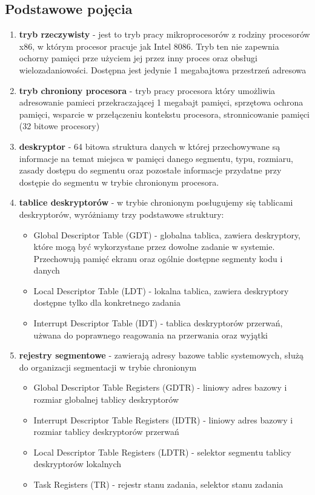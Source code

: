 \documentclass[a4paper,12pt]{article}
\begin{document}
	\subsection{Podstawowe pojęcia}
\begin{enumerate}
				\item{\textbf{tryb rzeczywisty} - jest to tryb pracy mikroprocesorów z rodziny procesorów x86, w którym procesor pracuje jak Intel 8086. Tryb ten nie zapewnia ochorny pamięci prze użyciem jej przez inny proces oraz obsługi wielozadaniowości. Dostępna jest jedynie 1 megabajtowa przestrzeń adresowa}

				\item{\textbf{tryb chroniony procesora} - tryb pracy procesora który umożliwia adresowanie pamieci przekraczającej 1 megabajt pamięci, sprzętowa ochrona pamięci, wsparcie w przełączeniu kontekstu procesora, stronnicowanie pamięci (32 bitowe procesory) }

				\item{\textbf{deskryptor} - 64 bitowa struktura danych w której przechowywane są informacje na temat miejsca w pamięci danego segmentu, typu, rozmiaru, zasady dostępu do segmentu oraz pozostałe informacje przydatne przy dostępie do segmentu w trybie chronionym procesora. }

				\item{\textbf{tablice deskryptorów} - w trybie chronionym posługujemy się tablicami deskryptorów, wyróżniamy trzy podstawowe struktury: }
\begin{itemize}
						\item{Global Descriptor Table (GDT) - globalna tablica, zawiera deskryptory, które mogą być wykorzystane przez dowolne zadanie w systemie. Przechowują pamięć ekranu oraz ogólnie dostępne segmenty kodu i danych}
						\item{Local Descriptor Table (LDT) - lokalna tablica, zawiera deskryptory dostępne tylko dla konkretnego zadania}
						\item{Interrupt Descriptor Table (IDT) - tablica deskryptorów przerwań, użwana do poprawnego reagowania na przerwania oraz wyjątki}
					\end{itemize}

\item{\textbf{rejestry segmentowe} - zawierają adresy bazowe tablic systemowych, służą do organizacji segmentacji w trybie chronionym}
\begin{itemize}
\item{Global Descriptor Table Registers (GDTR) - liniowy adres bazowy i rozmiar globalnej tablicy deskryptorów}
\item{Interrupt Descriptor Table Registers (IDTR) - liniowy adres bazowy i rozmiar tablicy deskryptorów przerwań}
\item{Local Descriptor Table Registers (LDTR) - selektor segmentu tablicy deskryptorów lokalnych}
\item{Task Registers (TR) - rejestr stanu zadania, selektor stanu zadania}
\end{itemize}



\end{enumerate}
\end{document}
